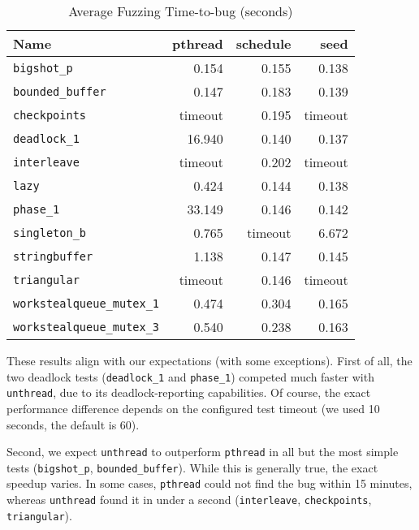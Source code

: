 \documentclass{article}
\begin{document}
\begin{table}[h]
  \centering
  \begin{tabular}{lrrr}
    \toprule
    Name & pthread & schedule & seed \\
    \midrule
    \texttt{bigshot\_p}                & 0.154   & 0.155   & 0.138 \\
    \texttt{bounded\_buffer}           & 0.147   & 0.183   & 0.139 \\
    \texttt{checkpoints}               & timeout & 0.195   & timeout \\
    \texttt{deadlock\_1}               & 16.940 & 0.140   & 0.137 \\
    \texttt{interleave}                & timeout & 0.202   & timeout \\
    \texttt{lazy}                      & 0.424   & 0.144   & 0.138 \\
    \texttt{phase\_1}                  & 33.149 & 0.146   & 0.142 \\
    \texttt{singleton\_b}              & 0.765   & timeout & 6.672 \\
    \texttt{stringbuffer}              & 1.138  & 0.147   & 0.145 \\
    \texttt{triangular}                & timeout & 0.146   & timeout \\
    \texttt{workstealqueue\_mutex\_1}  & 0.474   & 0.304   & 0.165 \\
    \texttt{workstealqueue\_mutex\_3}  & 0.540   & 0.238   & 0.163 \\
    \bottomrule
  \end{tabular}
  \caption{Average Fuzzing Time-to-bug (seconds)}
  \label{table:results}
\end{table}

These results align with our expectations (with some exceptions). First of all, the two deadlock tests (\texttt{deadlock\_1} and \texttt{phase\_1}) competed much faster with \texttt{unthread}, due to its deadlock-reporting capabilities. Of course, the exact performance difference depends on the configured test timeout (we used 10 seconds, the default is 60). 

Second, we expect \texttt{unthread} to outperform \texttt{pthread} in all but the most simple tests (\texttt{bigshot\_p}, \texttt{bounded\_buffer}). While this is generally true, the exact speedup varies. In some cases, \texttt{pthread} could not find the bug within 15 minutes, whereas \texttt{unthread} found it in under a second (\texttt{interleave}, \texttt{checkpoints}, \texttt{triangular}). 
\end{document}
